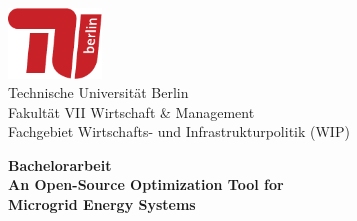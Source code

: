 \documentclass[
	11pt,								%
	DIV10,								%
	a4paper,         					%
	oneside,							%
	headheight=20pt,					%
	footheight=20pt,					%
    parskip=full,						%
    listof=totoc,						%
	bibliography=totoc,					%
	index=totoc,						%
]{scrartcl}
\begin{document}

	\thispagestyle{plain}
	\begin{titlepage}
		\vspace{0cm} 
		\begin{center}
			\includegraphics[width=2.5cm]{pictures/TU_Logo_kurz_4c_rot}\\
			\normalsize{Technische Universität Berlin}\\
			Fakultät VII Wirtschaft \& Management\\
			Fachgebiet Wirtschafts- und Infrastrukturpolitik (WIP)
		\end{center}
        \vfill
		\begin{center}
			\Large{\textbf{Bachelorarbeit}}\\
            \LARGE{\textbf{An Open-Source Optimization Tool for \\  Microgrid Energy Systems}}\\[2ex]            
			\vfill
			






\end{center}
\end{titlepage}
\end{document}
